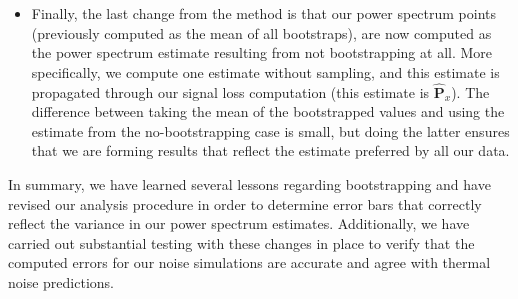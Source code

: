 \documentclass[preprint2,numberedappendix,tighten]{aastex6}  %
\begin{document}
\begin{itemize}
\item{Finally, the last change from the  method is that our power spectrum points (previously computed as the mean of all bootstraps), are now computed as the power spectrum estimate resulting from not bootstrapping at all. More specifically, we compute one estimate without sampling, and this estimate is propagated through our signal loss computation (this estimate is $\widehat{\textbf{P}}_{x}$). The difference between taking the mean of the bootstrapped values and using the estimate from the no-bootstrapping case is small, but doing the latter ensures that we are forming results that reflect the estimate preferred by all our data.}

\end{itemize}

In summary, we have learned several lessons regarding bootstrapping and have revised our analysis procedure in order to determine error bars that correctly reflect the variance in our power spectrum estimates. Additionally, we have carried out substantial testing with these changes in place to verify that the computed errors for our noise simulations are accurate and agree with thermal noise predictions.
\end{document}
